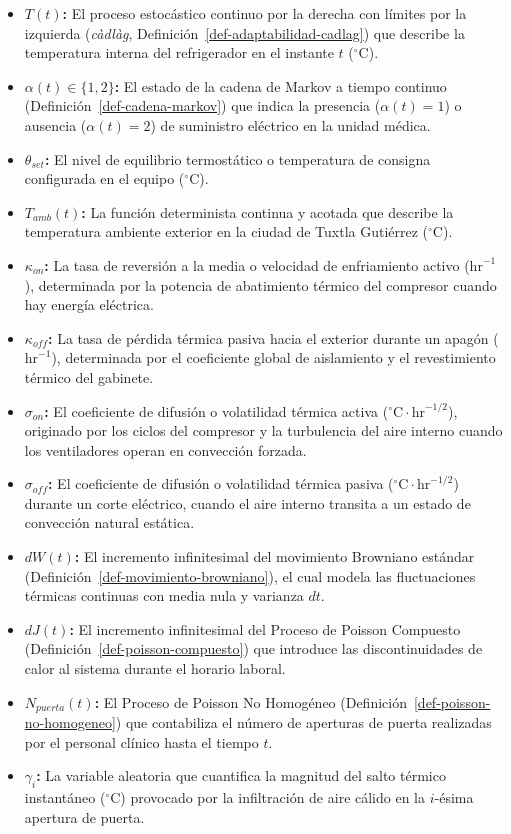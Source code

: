 \documentclass[
  spanish,
  us-letterpaper,
]{scrreprt}
\providecommand{\tightlist}{%
  \setlength{\itemsep}{0pt}\setlength{\parskip}{0pt}}
\numberwithin{equation}{section}
\theoremstyle{plain}
\theoremstyle{plain}
\theoremstyle{definition}
\theoremstyle{plain}
\theoremstyle{remark}
\begin{document}
\begin{itemize}
\tightlist
\item
  \textbf{\(T(t)\):} El proceso estocástico continuo por la derecha con
  límites por la izquierda (\emph{càdlàg},
  Definición~\ref{def-adaptabilidad-cadlag}) que describe la temperatura
  interna del refrigerador en el instante \(t\) (\(^\circ\text{C}\)).
\item
  \textbf{\(\alpha(t) \in \{1, 2\}\):} El estado de la cadena de Markov
  a tiempo continuo (Definición~\ref{def-cadena-markov}) que indica la
  presencia (\(\alpha(t)=1\)) o ausencia (\(\alpha(t)=2\)) de suministro
  eléctrico en la unidad médica.
\item
  \textbf{\(\theta_{set}\):} El nivel de equilibrio termostático o
  temperatura de consigna configurada en el equipo (\(^\circ\text{C}\)).
\item
  \textbf{\(T_{amb}(t)\):} La función determinista continua y acotada
  que describe la temperatura ambiente exterior en la ciudad de Tuxtla
  Gutiérrez (\(^\circ\text{C}\)).
\item
  \textbf{\(\kappa_{on}\):} La tasa de reversión a la media o velocidad
  de enfriamiento activo (\(\text{hr}^{-1}\)), determinada por la
  potencia de abatimiento térmico del compresor cuando hay energía
  eléctrica.
\item
  \textbf{\(\kappa_{off}\):} La tasa de pérdida térmica pasiva hacia el
  exterior durante un apagón (\(\text{hr}^{-1}\)), determinada por el
  coeficiente global de aislamiento y el revestimiento térmico del
  gabinete.
\item
  \textbf{\(\sigma_{on}\):} El coeficiente de difusión o volatilidad
  térmica activa (\(^\circ\text{C}\cdot\text{hr}^{-1/2}\)), originado
  por los ciclos del compresor y la turbulencia del aire interno cuando
  los ventiladores operan en convección forzada.
\item
  \textbf{\(\sigma_{off}\):} El coeficiente de difusión o volatilidad
  térmica pasiva (\(^\circ\text{C}\cdot\text{hr}^{-1/2}\)) durante un
  corte eléctrico, cuando el aire interno transita a un estado de
  convección natural estática.
\item
  \textbf{\(dW(t)\):} El incremento infinitesimal del movimiento
  Browniano estándar (Definición~\ref{def-movimiento-browniano}), el
  cual modela las fluctuaciones térmicas continuas con media nula y
  varianza \(dt\).
\item
  \textbf{\(dJ(t)\):} El incremento infinitesimal del Proceso de Poisson
  Compuesto (Definición~\ref{def-poisson-compuesto}) que introduce las
  discontinuidades de calor al sistema durante el horario laboral.
\item
  \textbf{\(N_{puerta}(t)\):} El Proceso de Poisson No Homogéneo
  (Definición~\ref{def-poisson-no-homogeneo}) que contabiliza el número
  de aperturas de puerta realizadas por el personal clínico hasta el
  tiempo \(t\).
\item
  \textbf{\(\gamma_i\):} La variable aleatoria que cuantifica la
  magnitud del salto térmico instantáneo (\(^\circ\text{C}\)) provocado
  por la infiltración de aire cálido en la \(i\)-ésima apertura de
  puerta.
\end{itemize}
\end{document}

